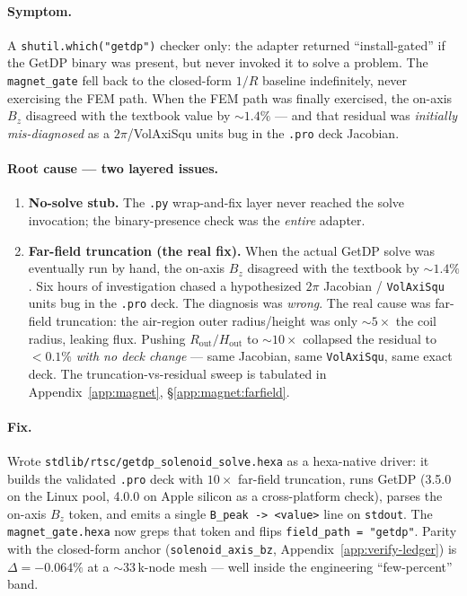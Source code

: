 \paragraph{Symptom.}
A \verb|shutil.which("getdp")| checker only: the adapter returned
``install-gated'' if the GetDP binary was present, but never invoked it
to solve a problem. The \texttt{magnet\_gate} fell back to the
closed-form $1/R$ baseline indefinitely, never exercising the FEM path.
When the FEM path was finally exercised, the on-axis $B_z$ disagreed
with the textbook value by $\sim1.4\%$ --- and that residual was
\emph{initially mis-diagnosed} as a $2\pi$/VolAxiSqu units bug in the
\verb|.pro| deck Jacobian.

\paragraph{Root cause --- two layered issues.}
\begin{enumerate}
  \item \textbf{No-solve stub.} The \verb|.py| wrap-and-fix layer never
        reached the solve invocation; the binary-presence check was the
        \emph{entire} adapter.
  \item \textbf{Far-field truncation (the real fix).} When the actual
        GetDP solve was eventually run by hand, the on-axis $B_z$
        disagreed with the textbook by $\sim1.4\%$. Six hours of
        investigation chased a hypothesized $2\pi$ Jacobian /
        \texttt{VolAxiSqu} units bug in the \verb|.pro| deck. The
        diagnosis was \emph{wrong}. The real cause was far-field
        truncation: the air-region outer radius/height was only
        $\sim5\times$ the coil radius, leaking flux. Pushing
        $R_{\text{out}}/H_{\text{out}}$ to $\sim10\times$ collapsed the
        residual to $<0.1\%$ \emph{with no deck change} --- same
        Jacobian, same \texttt{VolAxiSqu}, same exact deck. The
        truncation-vs-residual sweep is tabulated in
        Appendix~\ref{app:magnet}, \S\ref{app:magnet:farfield}.
\end{enumerate}

\paragraph{Fix.}
Wrote \verb|stdlib/rtsc/getdp_solenoid_solve.hexa| as a hexa-native
driver: it builds the validated \verb|.pro| deck with $10\times$
far-field truncation, runs GetDP (3.5.0 on the Linux pool, 4.0.0 on
Apple silicon as a cross-platform check), parses the on-axis $B_z$ token,
and emits a single \verb|B_peak -> <value>| line on \texttt{stdout}. The
\verb|magnet_gate.hexa| now greps that token and flips
\verb|field_path = "getdp"|. Parity with the closed-form anchor
(\verb|solenoid_axis_bz|, Appendix~\ref{app:verify-ledger}) is
$\Delta = -0.064\%$ at a $\sim33\,$k-node mesh --- well inside the
engineering ``few-percent'' band.

